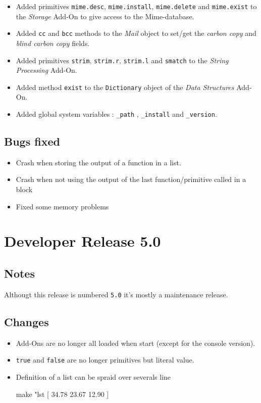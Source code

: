 \begin{itemize}
\item Added primitives {\tt mime.desc}, {\tt mime.install}, {\tt mime.delete} and {\tt mime.exist} to the {\it Storage} Add-On to give access to the \beos Mime-database.
\item Added {\tt cc} and {\tt bcc} methods to the {\it Mail} object to set/get the {\it carbon copy} and {\it blind carbon copy} fields.
\item Added primitives {\tt strim}, {\tt strim.r}, {\tt strim.l} and {\tt smatch} to the {\it String Processing} Add-On.
\item Added method {\tt exist} to the {\tt Dictionary} object of the {\it Data Structures} Add-On.
\item Added global system variables : {\tt \_path} , {\tt \_install} and {\tt \_version}.
\end{itemize}

\subsection{Bugs fixed}

\begin{itemize}
\item Crash when storing the output of a function in a list.
\item Crash when not using the output of the last function/primitive called in a block
\item Fixed some memory problems 
\end{itemize}

\section{Developer Release 5.0}

\subsection{Notes}

Althougt this release is numbered {\tt 5.0} it's mostly a maintenance release.

\subsection{Changes}

\begin{itemize}
\item Add-Ons are no longer all loaded when \squirrel start (except for the console version). 
\item {\tt true} and {\tt false} are no longer primitives but literal value.
\item Definition of a list can be spraid over severals line
\begin{verbatimtab}
make "lst [
	34.78
	23.67
	12.90
]
\end{verbatimtab}
\end{itemize}

